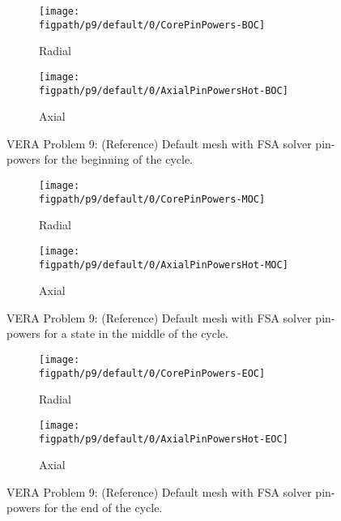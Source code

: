{{{      \begin{figure}[htbp]
        \centering
        \begin{subfigure}[t]{0.425\textwidth}
          \centering
          \texttt{[image: \\figpath/p9/default/0/CorePinPowers-BOC]}
          \caption{Radial\label{fig:LSMOC:P9:Default-FS:CorePinPowers:BOC}}
        \end{subfigure}%
        \begin{subfigure}[t]{0.425\textwidth}
          \centering
            \texttt{[image: \\figpath/p9/default/0/AxialPinPowersHot-BOC]}
            \caption{Axial\label{fig:LSMOC:P9:Default-FS:AxialPinPowers:BOC}}
        \end{subfigure}
        \caption{VERA Problem 9: (Reference) Default mesh with FSA solver pin-powers for the beginning of the cycle.\label{figs:LSMOC:P9:Default-FS:PinPowers:BOC}}
        \begin{subfigure}[t]{0.425\textwidth}
          \centering
          \texttt{[image: \\figpath/p9/default/0/CorePinPowers-MOC]}
          \caption{Radial\label{fig:LSMOC:P9:Default-FS:CorePinPowers:MOC}}
        \end{subfigure}%
        \begin{subfigure}[t]{0.425\textwidth}
          \centering
            \texttt{[image: \\figpath/p9/default/0/AxialPinPowersHot-MOC]}
            \caption{Axial\label{fig:LSMOC:P9:Default-FS:AxialPinPowers:MOC}}
        \end{subfigure}
        \caption{VERA Problem 9: (Reference) Default mesh with FSA solver pin-powers for a state in the middle of the cycle.\label{figs:LSMOC:P9:Default-FS:PinPowers:MOC}}
        \begin{subfigure}[t]{0.425\textwidth}
          \centering
          \texttt{[image: \\figpath/p9/default/0/CorePinPowers-EOC]}
          \caption{Radial\label{fig:LSMOC:P9:Default-FS:CorePinPowers:EOC}}
        \end{subfigure}%
        \begin{subfigure}[t]{0.425\textwidth}
          \centering
            \texttt{[image: \\figpath/p9/default/0/AxialPinPowersHot-EOC]}
            \caption{Axial\label{fig:LSMOC:P9:Default-FS:AxialPinPowers:EOC}}
        \end{subfigure}
        \caption{VERA Problem 9: (Reference) Default mesh with FSA solver pin-powers for the end of the cycle.\label{figs:LSMOC:P9:Default-FS:PinPowers:EOC}}
      \end{figure}

}}}
